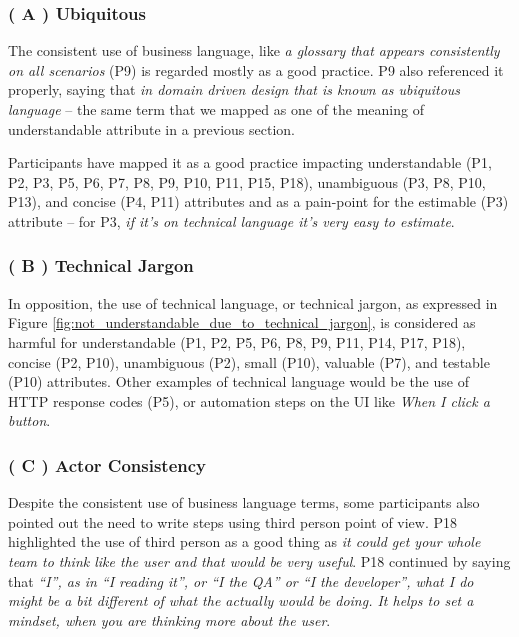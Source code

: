 \subsubsection{\textbf{( A ) Ubiquitous}}
The consistent use of business language, like \textit{a glossary that appears consistently on all scenarios} (P9) is regarded mostly as a good practice. P9 also referenced it properly, saying that \textit{in domain driven design that is known as ubiquitous language} -- the same term that we mapped as one of the meaning of understandable attribute in a previous section. 

Participants have mapped it as a good practice impacting understandable (P1, P2, P3, P5, P6, P7, P8, P9, P10, P11, P15, P18), unambiguous (P3, P8, P10, P13), and concise (P4, P11) attributes and as a pain-point for the estimable (P3) attribute -- for P3, \textit{if it's on technical language it's very easy to estimate}.

\subsubsection{\textbf{( B ) Technical Jargon}}
In opposition, the use of technical language, or technical jargon, as expressed in Figure \ref{fig:not_understandable_due_to_technical_jargon}, is considered as harmful for understandable (P1, P2, P5, P6, P8, P9, P11, P14, P17, P18), concise (P2, P10), unambiguous (P2), small (P10), valuable (P7), and testable (P10) attributes. Other examples of technical language would be the use of HTTP response codes (P5), or automation steps on the UI like \textit{When I click a button}.

\subsubsection{\textbf{( C ) Actor Consistency}}
Despite the consistent use of business language terms, some participants also pointed out the need to write steps using third person point of view. P18 highlighted the use of third person as a good thing as \textit{it could get your whole team to think like the user and that would be very useful}. P18 continued by saying that \textit{``I'', as in ``I reading it'',  or ``I the QA'' or ``I the developer'', what I do might be a bit different of what the actually would be doing. It helps to set a mindset, when you are thinking more about the user}.

